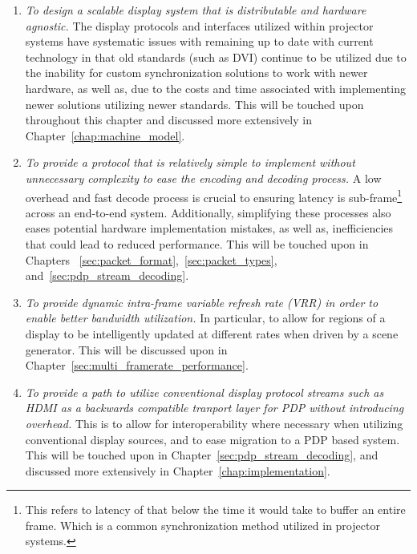     \begin{enumerate}
        \item {\em To design a scalable display system that is distributable and hardware agnostic.} The display protocols and interfaces utilized within projector systems have systematic issues with remaining up to date with current technology in that old standards (such as DVI) continue to be utilized due to the inability for custom synchronization solutions to work with newer hardware, as well as, due to the costs and time associated with implementing newer solutions utilizing newer standards. This will be touched upon throughout this chapter and discussed more extensively in Chapter~\ref{chap:machine_model}.
        \item {\em To provide a protocol that is relatively simple to implement without unnecessary complexity to ease the encoding and decoding process.} A low overhead and fast decode process is crucial to ensuring latency is sub-frame\footnote{This refers to latency of that below the time it would take to buffer an entire frame. Which is a common synchronization method utilized in projector systems.} across an end-to-end system. Additionally, simplifying these processes also eases potential hardware implementation mistakes, as well as, inefficiencies that could lead to reduced performance. This will be touched upon in Chapters~ \ref{sec:packet_format},~\ref{sec:packet_types}, and~\ref{sec:pdp_stream_decoding}.
        \item {\em To provide dynamic intra-frame variable refresh rate (VRR) in order to enable better bandwidth utilization.} In particular, to allow for regions of a display to be intelligently updated at different rates when driven by a scene generator. This will be discussed upon in Chapter~\ref{sec:multi_framerate_performance}.
        \item {\em To provide a path to utilize conventional display protocol streams such as HDMI as a backwards compatible tranport layer for PDP without introducing overhead.} This is to allow for interoperability where necessary when utilizing conventional display sources, and to ease migration to a PDP based system. This will be touched upon in Chapter~\ref{sec:pdp_stream_decoding}, and discussed more extensively in Chapter~\ref{chap:implementation}.
    \end{enumerate}

